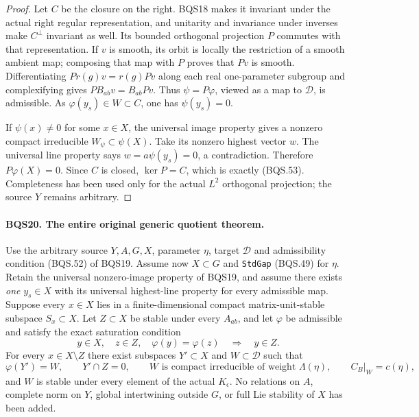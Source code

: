\begin{proof}
Let $C$ be the closure on the right.  BQS18 makes it invariant
under the actual right regular representation, and unitarity and
invariance under inverses make $C^\perp$ invariant as well.
Its bounded orthogonal projection $P$ commutes with that representation.
If $v$ is smooth, its orbit is locally the restriction of a smooth
ambient map; composing that map with $P$ proves that $Pv$ is smooth.
Differentiating $P r(g)v=r(g)Pv$ along each real one-parameter
subgroup and complexifying gives $PB_{ab}v=B_{ab}Pv$.
Thus $\psi=P\varphi$, viewed as a map to $\mathcal D$, is admissible.
As $\varphi(y_s)\in W\subset C$, one has $\psi(y_s)=0$.

If $\psi(x)\ne0$ for some $x\in X$, the universal image property
gives a nonzero compact irreducible $W_\psi\subset\psi(X)$.
Take its nonzero highest vector $w$.
The universal line property says $w=a\psi(y_s)=0$, a contradiction.
Therefore $P\varphi(X)=0$.  Since $C$ is closed, $\ker P=C$,
which is exactly (BQS.53).
Completeness has been used only for the actual $L^2$ orthogonal
projection; the source $Y$ remains arbitrary.
\end{proof}

\paragraph{BQS20. The entire original generic quotient theorem.}
\label{claim:BQS20}
Use the arbitrary source $Y,A,G,X$, parameter $\eta$, target
$\mathcal D$ and admissibility condition (BQS.52) of BQS19.
Assume now $X\subset G$ and \texttt{StdGap} (BQS.49) for $\eta$.
Retain the universal nonzero-image property of BQS19, and assume
there exists \emph{one} $y_s\in X$ with its universal highest-line
property for every admissible map.
Suppose every $x\in X$ lies in a finite-dimensional compact
matrix-unit-stable subspace $S_x\subset X$.
Let $Z\subset X$ be stable under every $A_{ab}$, and let $\varphi$
be admissible and satisfy the exact saturation condition
\[
 y\in X,\quad z\in Z,\quad \varphi(y)=\varphi(z)
                       \quad\Longrightarrow\quad y\in Z.
 \tag{BQS.54}
\]
For every $x\in X\setminus Z$ there exist subspaces $Y'\subset X$
and $W\subset\mathcal D$ such that
\[
 \varphi(Y')=W,\qquad Y'\cap Z=0,\qquad
 W\text{ is compact irreducible of weight }\Lambda(\eta),
 \qquad C_B|_W=c(\eta),
 \tag{BQS.55}
\]
and $W$ is stable under every element of the actual $K_\epsilon$.
No relations on $A$, complete norm on $Y$, global intertwining
outside $G$, or full Lie stability of $X$ has been added.

